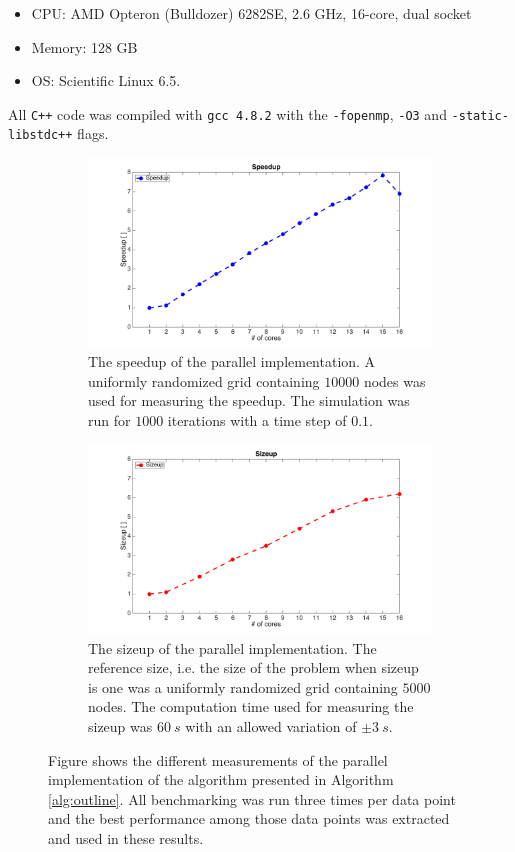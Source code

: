 \begin{itemize}
\item CPU: AMD Opteron (Bulldozer) 6282SE, 2.6 GHz, 16-core, dual socket
\item Memory: 128 GB
\item OS: Scientific Linux 6.5.
\end{itemize}

\noindent All \texttt{C++} code was compiled with \texttt{gcc 4.8.2} with the \texttt{-fopenmp}, \texttt{-O3} and  \texttt{-static-libstdc++} flags.

\begin{figure}
\centering
\begin{subfigure}[b]{1\textwidth}
\includegraphics[width=\textwidth, height=0.5\textwidth]{img/speedup.png}
\caption{The speedup of the parallel implementation. A uniformly randomized grid containing $10000$ nodes was used for measuring the speedup. The simulation was run for $1000$ iterations with a time step of $0.1$.}
\end{subfigure}

\begin{subfigure}[b]{1\textwidth}
\includegraphics[width=\textwidth, height=0.5\textwidth]{img/sizeup.png}
\caption{The sizeup of the parallel implementation. The reference size, i.e. the size of the problem when sizeup is one was a uniformly randomized grid containing $5000$ nodes. The computation time used for measuring the sizeup was $60~s$ with an allowed variation of $\pm 3~s$. }
\end{subfigure}
\caption{Figure shows the different measurements of the parallel implementation of the algorithm presented in Algorithm \ref{alg:outline}. All benchmarking was run three times per data point and the best performance among those data points was extracted and used in these results.}
\label{fig:speed_size}
\end{figure}


